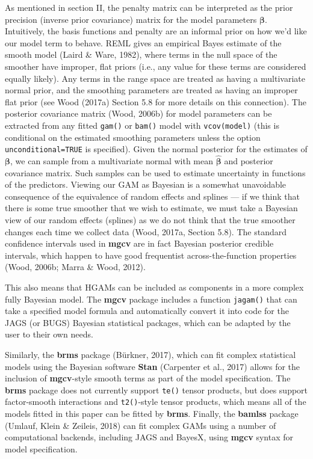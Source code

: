 \documentclass[12pt]{article}
\begin{document}
As mentioned in section II, the penalty matrix can be interpreted as the
prior precision (inverse prior covariance) matrix for the model
parameters \(\boldsymbol{\beta}\). Intuitively, the basis functions and
penalty are an informal prior on how we'd like our model term to behave.
REML gives an empirical Bayes estimate of the smooth model (Laird \&
Ware, 1982), where terms in the null space of the smoother have
improper, flat priors (i.e., any value for these terms are considered
equally likely). Any terms in the range space are treated as having a
multivariate normal prior, and the smoothing parameters are treated as
having an improper flat prior (see Wood (2017a) Section 5.8 for more
details on this connection). The posterior covariance matrix (Wood,
2006b) for model parameters can be extracted from any fitted
\texttt{gam()} or \texttt{bam()} model with \texttt{vcov(model)} (this
is conditional on the estimated smoothing parameters unless the option
\texttt{unconditional=TRUE} is specified). Given the normal posterior
for the estimates of \(\boldsymbol{\beta}\), we can sample from a
multivariate normal with mean \(\hat{\boldsymbol{\beta}}\) and posterior
covariance matrix. Such samples can be used to estimate uncertainty in
functions of the predictors. Viewing our GAM as Bayesian is a somewhat
unavoidable consequence of the equivalence of random effects and splines
--- if we think that there is some true smoother that we wish to
estimate, we must take a Bayesian view of our random effects (splines)
as we do not think that the true smoother changes each time we collect
data (Wood, 2017a, Section 5.8). The standard confidence intervals used
in \textbf{mgcv} are in fact Bayesian posterior credible intervals,
which happen to have good frequentist across-the-function properties
(Wood, 2006b; Marra \& Wood, 2012).

This also means that HGAMs can be included as components in a more
complex fully Bayesian model. The \textbf{mgcv} package includes a
function \texttt{jagam()} that can take a specified model formula and
automatically convert it into code for the JAGS (or BUGS) Bayesian
statistical packages, which can be adapted by the user to their own
needs.

Similarly, the \textbf{brms} package (Bürkner, 2017), which can fit
complex statistical models using the Bayesian software \textbf{Stan}
(Carpenter et al., 2017) allows for the inclusion of \textbf{mgcv}-style
smooth terms as part of the model specification. The \textbf{brms}
package does not currently support \texttt{te()} tensor products, but
does support factor-smooth interactions and \texttt{t2()}-style tensor
products, which means all of the models fitted in this paper can be
fitted by \textbf{brms}. Finally, the \textbf{bamlss} package (Umlauf,
Klein \& Zeileis, 2018) can fit complex GAMs using a number of
computational backends, including JAGS and BayesX, using \textbf{mgcv}
syntax for model specification.
\end{document}
